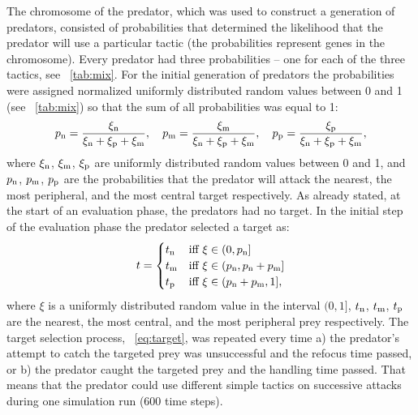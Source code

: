 The chromosome of the predator, which was used to construct a generation of predators, consisted of probabilities that determined the likelihood that the predator will use a particular tactic (\ie the probabilities represent genes in the chromosome). Every predator had three probabilities -- one for each of the three tactics, see \tablename~\ref{tab:mix}. For the initial generation of predators the probabilities were assigned normalized uniformly distributed random values between 0 and 1 (see \tablename~\ref{tab:mix}) so that the sum of all probabilities was equal to 1:
%
\begin{equation}
  p_\textnormal{n}=\frac{\xi_\textnormal{n}}{\xi_\textnormal{n}+\xi_\textnormal{p}+\xi_\textnormal{m}},\quad p_\textnormal{m}=\frac{\xi_\textnormal{m}}{\xi_\textnormal{n}+\xi_\textnormal{p}+\xi_\textnormal{m}},\quad p_\textnormal{p}=\frac{\xi_\textnormal{p}}{\xi_\textnormal{n}+\xi_\textnormal{p}+\xi_\textnormal{m}},
\end{equation}
%
where $\xi_\textnormal{n}$, $\xi_\textnormal{m}$, $\xi_\textnormal{p}$ are uniformly distributed random values between 0 and 1, and $p_\textnormal{n}$, $p_\textnormal{m}$, $p_\textnormal{p}$ are the probabilities that the predator will attack the nearest, the most peripheral, and the most central target respectively. As already stated, at the start of an evaluation phase, the predators had no target. In the initial step of the evaluation phase the predator selected a target as:
%
\begin{equation}
  t = \begin{cases}
    t_\textnormal{n} & \textnormal{iff}\  \xi \in (0,p_\textnormal{n}]\\
    t_\textnormal{m} & \textnormal{iff}\  \xi \in (p_\textnormal{n},p_\textnormal{n}+p_\textnormal{m}]\\
    t_\textnormal{p} & \textnormal{iff}\  \xi \in (p_\textnormal{n}+p_\textnormal{m},1],
  \end{cases}
  \label{eq:target}
\end{equation}
%
where $\xi$ is a uniformly distributed random value in the interval $(0, 1]$, $t_\textnormal{n}$, $t_\textnormal{m}$, $t_\textnormal{p}$ are the nearest, the most central, and the most peripheral prey respectively. The target selection process, \eq~\eqref{eq:target}, was repeated every time a) the predator's attempt to catch the targeted prey was unsuccessful and the refocus time passed, or b) the predator caught the targeted prey and the handling time passed. That means that the predator could use different simple tactics on successive attacks during one simulation run (600 time steps).

